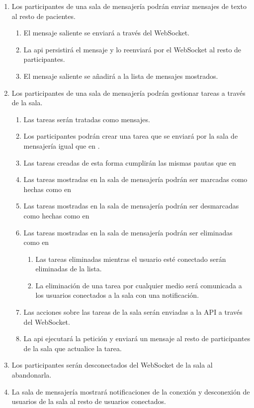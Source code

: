\begin{enumerate}[label*=RSV \arabic*.]
\begin{enumerate}[label*=\arabic*.]
    \end{enumerate}
    \item \label{req:envio_mensaje} Los participantes de una sala de mensajería podrán enviar mensajes de texto al resto de pacientes.
    \begin{enumerate}[label*=\arabic*.]
        \item El mensaje saliente se enviará a través del WebSocket.
        \item La \acrshort{api} persistirá el mensaje y lo reenviará por el WebSocket al resto de participantes.
        \item El mensaje saliente se añadirá a la lista de mensajes mostrados.
    \end{enumerate}
    \item Los participantes de una sala de mensajería podrán gestionar tareas a través de la sala.
    \begin{enumerate}[label*=\arabic*.]
        \item Las tareas serán tratadas como mensajes.
        \item Los participantes podrán crear una tarea que se enviará por la sala de mensajería igual que en .
        \item Las tareas creadas de esta forma cumplirán las mismas pautas que en 
        \item Las tareas mostradas en la sala de mensajería podrán ser marcadas como hechas como en 
        \item Las tareas mostradas en la sala de mensajería podrán ser desmarcadas como hechas como en 
        \item Las tareas mostradas en la sala de mensajería podrán ser eliminadas como en 
        \begin{enumerate}[label*=\arabic*.]
            \item Las tareas eliminadas mientras el usuario esté conectado serán eliminadas de la lista.
            \item La eliminación de una tarea por cualquier medio será comunicada a los usuarios conectados a la sala con una notificación.
        \end{enumerate}
        \item Las acciones sobre las tareas de la sala serán enviadas a la API a través del WebSocket.
        \item La \acrshort{api} ejecutará la petición y enviará un mensaje al resto de participantes de la sala que actualice la tarea.
    \end{enumerate}
    \item Los participantes serán desconectados del WebSocket de la sala al abandonarla.
    \item La sala de mensajería mostrará notificaciones de la conexión y desconexión de usuarios de la sala al resto de usuarios conectados.
\end{enumerate}

